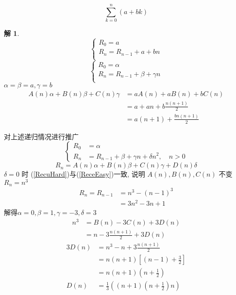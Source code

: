 \documentclass[mode=geye, chinesefont=founder]{elegantnote}
\newtheorem{solve}{解}
\begin{document}
\begin{example}
    \begin{equation*}
        \sum_{k=0}^{n}(a+b k)
    \end{equation*}
\end{example}
\begin{solve}
    \begin{equation*}
        \left\{
            \begin{array}{l}
                R_0 = a \\
                R_n = R_{n-1} + a+bn\\
            \end{array}
        \right.
    \end{equation*}
    \begin{equation*}
        \left\{
            \begin{array}{l}
                R_0 = \alpha \\
                R_n = R_{n-1} + \beta + \gamma n\\
            \end{array}
        \right.
    \end{equation*}
    $ \alpha = \beta =a, \gamma = b $ 
    \begin{align*}
        A(n)\alpha + B(n)\beta + C(n)\gamma 
        &= a A(n) + a B(n) + b C(n)\\
        &= a + a n + b \frac{n(n+1)}{2}\\
        &= a(n+1)+\frac{bn(n+1)}{2}
    \end{align*}
\end{solve}

对上述递归情况进行推广
\begin{equation}\label{RecuHard}
    \left\{
    \begin{aligned}
        R_0 &= \alpha \\
        R_n &= R_{n-1} + \beta + \gamma n + \delta n^2, \quad n>0
    \end{aligned}
    \right.
\end{equation}
\begin{equation}\label{RecuHardABC}
    R_n = A(n)\alpha + B(n)\beta + C(n)\gamma +D(n) \delta
\end{equation}
$ \delta=0 $ 时 (\ref{RecuHard})与(\ref{ReceEasy})一致, 说明
$ A(n), B(n), C(n) $ 不变\\
$ R_n = n^3 $ 
\begin{align*}
    R_n = R_{n-1} &= n^3 - (n-1)^3 \\
    &= 3n^2 - 3n + 1
\end{align*}
解得$ \alpha=0, \beta=1, \gamma=-3, \delta=3 $ 
\begin{align*}
    n^3 &= B(n)-3C(n)+3D(n)\\
    &= n-3 \frac{n(n+1)}{2}+3D(n)
\end{align*}
\begin{align*}
    3D(n) &= n^3 - n + 3 \frac{n(n+1)}{2} \\
    &= n(n+1) \left[(n-1)+\frac{3}{2}\right] \\
    &= n(n+1)(n+\frac{1}{2})\\
    D(n) &= \frac{1}{3}\left((n+1)(n+\frac{1}{2})n\right)
\end{align*}
\end{document}
